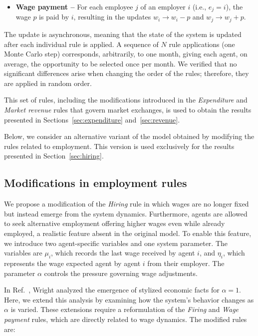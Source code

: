 \begin{itemize}
\item {\bf Wage payment --} 
For each employee $j$ of an employer $i$ (i.e., $e_j=i$), the wage $p$ is paid by $i$, resulting in the updates $w_i \to w_i - p$ and $w_j \to w_j + p$.
\end{itemize}



The update is asynchronous, meaning that the state of the system is updated after each individual rule is applied. A sequence of $N$ rule applications (one Monte Carlo step) corresponds, arbitrarily, to one month, giving each agent, on average, the opportunity to be selected once per month. We verified that no significant differences arise when changing the order of the rules; therefore, they are applied in random order.

This set of rules, including the modifications introduced in the {\it Expenditure} and {\it Market revenue} rules that govern market exchanges, is used to obtain the results presented in Sections~\ref{sec:expenditure} and~\ref{sec:revenue}.

Below, we consider an alternative variant of the model obtained by modifying the rules related to employment. This version is used exclusively for the results presented in Section~\ref{sec:hiring}.


\subsection*{Modifications in employment rules}



We propose a modification of the {\it Hiring} rule in which wages are no longer fixed but instead emerge from the system dynamics. Furthermore, agents are allowed to seek alternative employment offering higher wages even while already employed, a realistic feature absent in the original model.
%
To enable this feature, we introduce two agent-specific variables and one system parameter. The variables are $\mu_i$, which records the last wage received by agent $i$, and $\eta_i$, which represents the wage expected agent by agent $i$ from their employer. The parameter $\alpha$ controls the pressure governing wage adjustments.

In Ref.~\cite{WRIGHT2010}, Wright analyzed the emergence of stylized economic facts for $\alpha = 1$. Here, we extend this analysis by examining how the system’s behavior changes as $\alpha$ is varied.
These extensions require a reformulation of the {\it Firing} and {\it Wage payment} rules, which are directly related to wage dynamics. The modified rules are:

